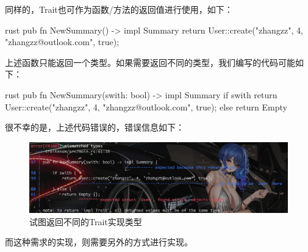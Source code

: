 同样的，Trait也可作为函数/方法的返回值进行使用，如下：
\begin{code-block}{rust}
pub fn NewSummary() -> impl Summary {
    return User::create("zhangzz", 4, "zhangzz@outlook.com", true);
}
\end{code-block}
上述函数只能返回一个类型。如果需要返回不同的类型，我们编写的代码可能如下：
\begin{code-block}{rust}
pub fn NewSummary(swith: bool) -> impl Summary {
    if swith {
        return User::create("zhangzz", 4, "zhangzz@outlook.com", true);
    } else {
        return Empty{}
    }
}
\end{code-block}
很不幸的是，上述代码错误的，错误信息如下：
\begin{figure}[H]
  \centering
  \includegraphics[width=\linewidth]{rust_trait_return.png}
  \caption{试图返回不同的Trait实现类型}
  \label{fig:rust_trait_return}
\end{figure}
而这种需求的实现，则需要另外的方式进行实现。

